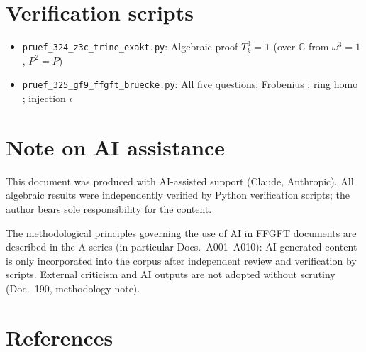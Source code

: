 \section*{Verification scripts}
\begin{itemize}
  \item \texttt{pruef\_324\_z3c\_trine\_exakt.py}:
    Algebraic proof $T_k^3=\mathbf{1}$ (over $\mathbb{C}$ from $\omega^3=1$, $P^2=P$) \BM
  \item \texttt{pruef\_325\_gf9\_ffgft\_bruecke.py}:
    All five questions; Frobenius \BM; ring homo \BM; injection $\iota$ \BM
\end{itemize}

\section*{Note on AI assistance}

\noindent
This document was produced with AI-assisted support (Claude, Anthropic).
All algebraic results were independently verified by Python verification
scripts; the author bears sole responsibility for the content.

The methodological principles governing the use of AI in FFGFT documents
are described in the A-series (in particular Docs.~A001--A010):
AI-generated content is only incorporated into the corpus after
independent review and verification by scripts.
External criticism and AI outputs are not adopted without scrutiny
(Doc.~190, methodology note).

\section*{References}

